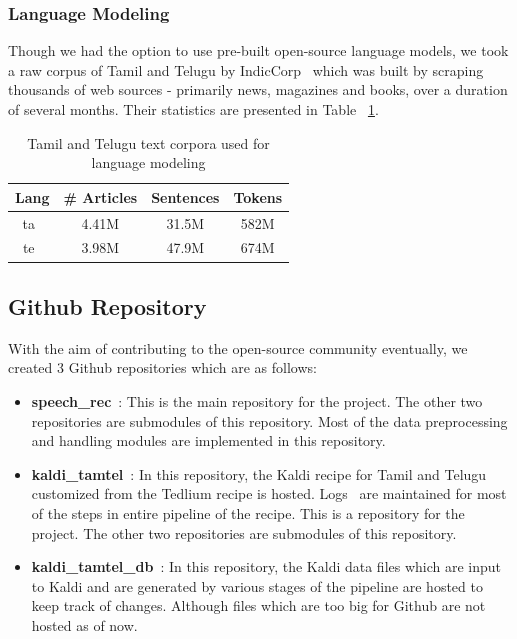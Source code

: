 \documentclass[11pt]{article} \usepackage{spconf,amsmath,graphicx}
\begin{document}
\subsubsection{Language Modeling} 
Though we had the option to use pre-built open-source language models, we took a raw corpus of Tamil and Telugu by IndicCorp~\cite{kakwani2020indicnlpsuite}
which was built by scraping thousands of web sources - primarily news, magazines and books, over a duration of several months. Their statistics are presented in Table ~\ref{tab:langmodel}.

\begin{table}[h]
\begin{center}
\begin{tabular}[width=5cm]{ |c|c|c|c| } 
\hline Lang & \# Articles & Sentences & Tokens\\ \hline
ta~\cite{tamilkakwani2020indicnlpsuite} & 4.41M & 31.5M & 582M\\ \hline
te~\cite{telugukakwani2020indicnlpsuite} & 3.98M & 47.9M & 674M\\ \hline





\end{tabular}

\caption{Tamil and Telugu text corpora used for language modeling}
\label{tab:langmodel} \end{center} \end{table}

\subsection{Github Repository}
With the aim of contributing to the open-source community eventually, we created 3 Github repositories which are as follows:
\begin{itemize}
	\item \textbf{speech\_rec}~\cite{speech_rec}: This is the main repository for the project. The other two repositories are submodules of this repository.
	Most of the data preprocessing and handling modules are implemented in this repository.
	\item \textbf{kaldi\_tamtel}~\cite{kalditamtel}: In this repository, the Kaldi recipe for Tamil and Telugu customized from the Tedlium recipe is hosted.
	 Logs~\cite{logs} are maintained for most of the steps in entire pipeline of the recipe. This is a repository for the project. The other two repositories are submodules of this repository.
	\item \textbf{kaldi\_tamtel\_db}~\cite{kaldidb}: In this repository, the Kaldi data files which are input to Kaldi and are generated by various stages of the pipeline are hosted to keep track of changes.
	Although files which are too big for Github are not hosted as of now. 
\end{itemize}
\end{document}
